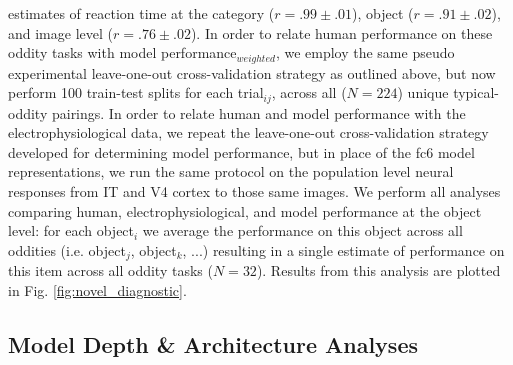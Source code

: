 \documentclass[11pt]{article}
\begin{document}
estimates of reaction time at the category  ($r = .99 \pm .01$), object  ($r = .91 \pm .02$), and image level ($r = .76 \pm .02$). In order to relate human performance on these oddity tasks with model performance$_{weighted}$, we employ the same pseudo experimental leave-one-out cross-validation strategy as outlined above, but now perform 100 train-test splits for each trial$_{ij}$, across all ($N=224$) unique typical-oddity pairings. In order to relate human and model performance with the electrophysiological data, we repeat the leave-one-out cross-validation strategy developed for determining model performance, but in place of the fc6 model representations, we run the same protocol on the population level neural responses from IT and V4 cortex to those same images. We perform all analyses comparing human, electrophysiological, and model performance at the object level: for each object$_{i}$ we average the performance on this object across all oddities (i.e. object$_{j}$, object$_{k}$, ...) resulting in a single estimate of performance on this item across all oddity tasks ($N=32$). Results from this analysis are plotted in Fig. \ref{fig:novel_diagnostic}. 

\subsection{Model Depth \& Architecture Analyses}
\end{document}
